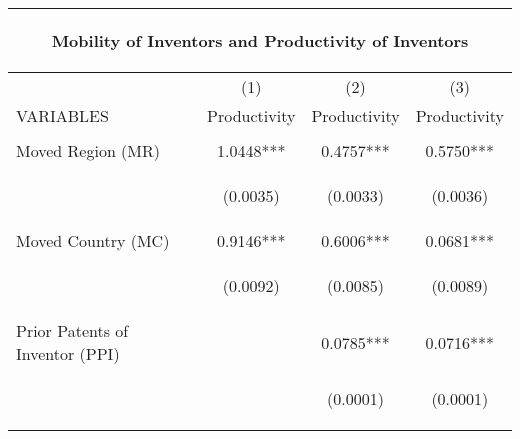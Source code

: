 \begin{center}
\begin{tabular}{lccc}
\multicolumn{4}{c}{\begin{large}Mobility of Inventors and Productivity of Inventors\end{large}} \\ \hline
 & (1) & (2) & (3) \\
VARIABLES & Productivity & Productivity & Productivity \\ \hline
\vspace{4pt} & \begin{footnotesize}\end{footnotesize} & \begin{footnotesize}\end{footnotesize} & \begin{footnotesize}\end{footnotesize} \\
Moved Region (MR) & 1.0448*** & 0.4757*** & 0.5750*** \\
\vspace{4pt} & \begin{footnotesize}(0.0035)\end{footnotesize} & \begin{footnotesize}(0.0033)\end{footnotesize} & \begin{footnotesize}(0.0036)\end{footnotesize} \\
Moved Country (MC) & 0.9146*** & 0.6006*** & 0.0681*** \\
\vspace{4pt} & \begin{footnotesize}(0.0092)\end{footnotesize} & \begin{footnotesize}(0.0085)\end{footnotesize} & \begin{footnotesize}(0.0089)\end{footnotesize} \\
Prior Patents of Inventor (PPI) &  & 0.0785*** & 0.0716*** \\
\vspace{4pt} & \begin{footnotesize}\end{footnotesize} & \begin{footnotesize}(0.0001)\end{footnotesize} & \begin{footnotesize}(0.0001)\end{footnotesize} \\

\end{tabular}
\end{center}
